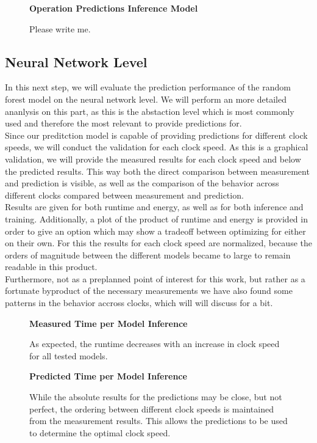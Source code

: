 \begin{figure}[htbp]
    \centering
    \parbox{1.1\textwidth}{\centering\textbf{Operation Predictions Inference Model}}
    \caption{Please write me.}
    \label{fig:testsetops_inf}
\end{figure}

\subsection{Neural Network Level}


In this next step, we will evaluate the prediction performance of the random forest model on the neural network level. We will perform an more detailed ananlysis on this part, as this is the abstaction level which is most commonly used and therefore the most relevant to provide predictions for. \\
Since our preditction model is capable of providing predictions for different clock speeds, we will conduct the validation for each clock speed. As this is a graphical validation, we will provide the measured results for each clock speed and below the predicted results. This way both the direct comparison between measurement and prediction is visible, as well as the comparison of the behavior across different clocks compared between measurement and prediction. \\
Results are given for both runtime and energy, as well as for both inference and training. Additionally, a plot of the product of runtime and energy is provided in order to give an option which may show a tradeoff between optimizing for either on their own. For this the results for each clock speed are normalized, because the orders of magnitude between the different models became to large to remain readable in this product. \\
Furthermore, not as a preplanned point of interest for this work, but rather as a fortunate byproduct of the necessary measurements we have also found some patterns in the behavior accross clocks, which will will discuss for a bit.



\begin{figure}[htbp]
    \centering
    \parbox{1.1\textwidth}{\centering\textbf{Measured Time per Model Inference}}
    \caption{As expected, the runtime decreases with an increase in clock speed for all tested models.}
    \label{fig:grpfmtimeinf}
    \vspace{0.2cm}
    \parbox{1.1\textwidth}{\centering\textbf{Predicted Time per Model Inference}}
    \caption{While the absolute results for the predictions may be close, but not perfect, the ordering between different clock speeds is maintained from the measurement results. This allows the predictions to be used to determine the optimal clock speed.}
    \label{fig:gprpredtimeinf}
\end{figure}


